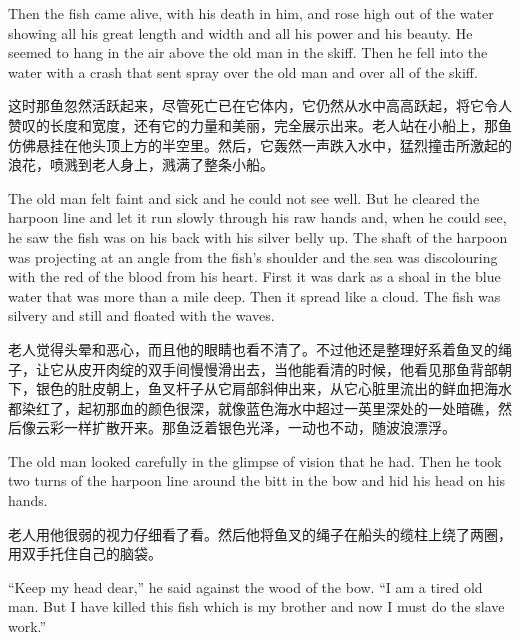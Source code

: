 \begin{paracol}{2}
\switchcolumn*

Then the fish came alive, with his death in him, and rose high out of the
water showing all his great length and width and all his power and his
beauty. He seemed to \gls{hang} in the air above the old man in the skiff.
Then he fell into the water with a crash that sent \gls{spray} over the old
man and over all of the skiff.

\switchcolumn

这时那鱼忽然活跃起来，尽管死亡已在它体内，它仍然从水中高高跃起，将它令人赞叹的长度和宽度，还有它的力量和美丽，完全展示出来。老人站在小船上，那鱼仿佛悬挂在他头顶上方的半空里。然后，它轰然一声跌入水中，猛烈撞击所激起的浪花，喷溅到老人身上，溅满了整条小船。

\switchcolumn*

The old man felt faint and sick and he could not see well. But he cleared
the harpoon line and let it run slowly through his raw hands and, when he
could see, he saw the fish was on his back with his silver belly up. The
shaft of the harpoon was projecting at an angle from the fish's shoulder and
the sea was \gls{discolouring} with the red of the blood from his heart.
First it was dark as a \gls{shoal} in the blue water that was more than a
mile deep. Then it spread like a cloud. The fish was silvery and still and
floated with the \glspl{wave}.

\switchcolumn

老人觉得头晕和恶心，而且他的眼睛也看不清了。不过他还是整理好系着鱼叉的绳子，让它从皮开肉绽的双手间慢慢滑出去，当他能看清的时候，他看见那鱼背部朝下，银色的肚皮朝上，鱼叉杆子从它肩部斜伸出来，从它心脏里流出的鲜血把海水都染红了，起初那血的颜色很深，就像蓝色海水中超过一英里深处的一处暗礁，然后像云彩一样扩散开来。那鱼泛着银色光泽，一动也不动，随波浪漂浮。

\switchcolumn*

The old man looked carefully in the \gls{glimpse} of \gls{vision} that he
had. Then he took two turns of the harpoon line around the bitt in the bow
and \gls{hid} his head on his hands.

\switchcolumn

老人用他很弱的视力仔细看了看。然后他将鱼叉的绳子在船头的缆柱上绕了两圈，用双手托住自己的脑袋。

\switchcolumn*

``Keep my head dear,'' he said against the wood of the bow. ``I am a tired
old man. But I have killed this fish which is my brother and now I must do
the slave work.''


\end{paracol}
